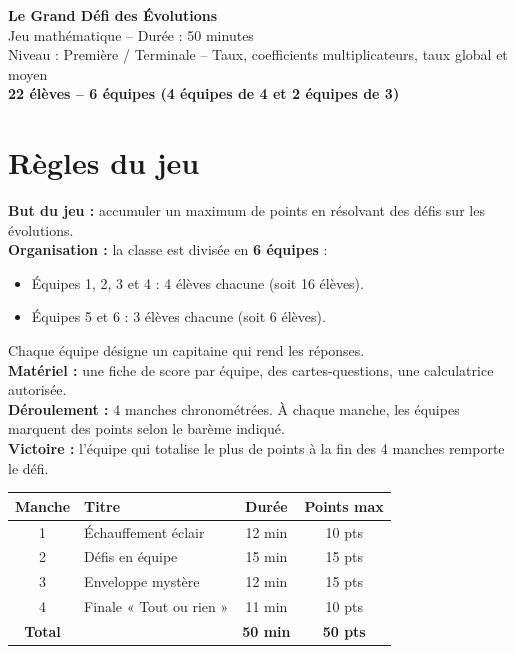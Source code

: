 \documentclass[12pt,a4paper]{article}
\begin{document}
\begin{center}
{\Huge\bfseries\color{bleufonce} Le Grand Défi des Évolutions}\\[0.3cm]
{\large Jeu mathématique -- Durée : 50 minutes}\\[0.2cm]
{\large Niveau : Première / Terminale -- Taux, coefficients multiplicateurs, taux global et moyen}\\[0.2cm]
{\large\bfseries 22 élèves -- 6 équipes (4 équipes de 4 et 2 équipes de 3)}
\end{center}

\vspace{0.3cm}

\section*{Règles du jeu}

\begin{regle}
\textbf{But du jeu :} accumuler un maximum de points en résolvant des défis sur les évolutions.\\[0.2cm]
\textbf{Organisation :} la classe est divisée en \textbf{6 équipes} :
\begin{itemize}
    \item Équipes 1, 2, 3 et 4 : 4 élèves chacune (soit 16 élèves).
    \item Équipes 5 et 6 : 3 élèves chacune (soit 6 élèves).
\end{itemize}
Chaque équipe désigne un capitaine qui rend les réponses.\\[0.2cm]
\textbf{Matériel :} une fiche de score par équipe, des cartes-questions, une calculatrice autorisée.\\[0.2cm]
\textbf{Déroulement :} 4 manches chronométrées. À chaque manche, les équipes marquent des points selon le barème indiqué.\\[0.2cm]
\textbf{Victoire :} l'équipe qui totalise le plus de points à la fin des 4 manches remporte le défi.
\end{regle}

\vspace{0.3cm}

\begin{center}
\renewcommand{\arraystretch}{1.4}
\begin{tabular}{|c|l|c|c|}
\hline
\textbf{Manche} & \textbf{Titre} & \textbf{Durée} & \textbf{Points max} \\
\hline
1 & Échauffement éclair & 12 min & 10 pts \\
\hline
2 & Défis en équipe & 15 min & 15 pts \\
\hline
3 & Enveloppe mystère & 12 min & 15 pts \\
\hline
4 & Finale « Tout ou rien » & 11 min & 10 pts \\
\hline
\textbf{Total} & & \textbf{50 min} & \textbf{50 pts} \\
\hline
\end{tabular}
\end{center}
\end{document}
